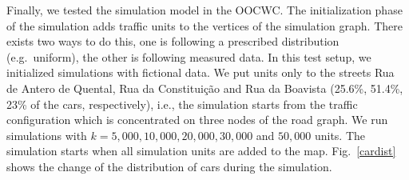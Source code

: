 \documentclass[b5paper,12pt]{report}
\theoremstyle{definition}
\begin{document}
Finally, we tested the simulation model in the OOCWC. The initialization phase of the simulation adds traffic units to the vertices of the simulation graph. There exists two ways to do this, one is following a prescribed distribution (e.g.~uniform), the other is following measured data. In this test setup, we initialized simulations with fictional data. We put units only to the streets Rua de Antero de Quental, Rua da Constitui\c{c}\~ao and Rua da Boavista (25.6\%, 51.4\%, 23\% of the cars, respectively), i.e., the simulation starts from the traffic configuration which is concentrated on three nodes of the road graph. We run simulations with $k=5,000, 10,000, 20,000, 30,000$ and $50,000$ units. The simulation starts when all simulation units are added to the map. Fig.~\ref{cardist} shows the change of the distribution of cars during the simulation.
\end{document}
